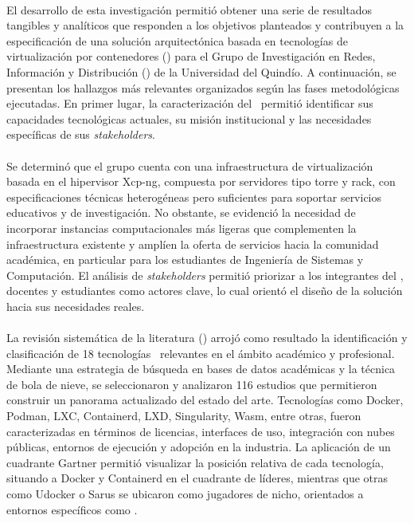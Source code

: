 \label{cap:resultados}
\mbox{}\\
El desarrollo de esta investigación permitió obtener una serie de resultados tangibles y analíticos que responden a los objetivos planteados y contribuyen a la especificación de una solución arquitectónica basada en tecnologías de virtualización por contenedores (\VBC) para el Grupo de Investigación en Redes, Información y Distribución (\GRID) de la Universidad del Quindío. A continuación, se presentan los hallazgos más relevantes organizados según las fases metodológicas ejecutadas. En primer lugar, la caracterización del \GRID\ permitió identificar sus capacidades tecnológicas actuales, su misión institucional y las necesidades específicas de sus \textit{stakeholders}.\\ \\
\noindent
Se determinó que el grupo cuenta con una infraestructura de virtualización basada en el hipervisor Xcp-ng, compuesta por servidores tipo torre y rack, con especificaciones técnicas heterogéneas pero suficientes para soportar servicios educativos y de investigación. No obstante, se evidenció la necesidad de incorporar instancias computacionales más ligeras que complementen la infraestructura existente y amplíen la oferta de servicios hacia la comunidad académica, en particular para los estudiantes de Ingeniería de Sistemas y Computación. El análisis de \textit{stakeholders} permitió priorizar a los integrantes del \GRID, docentes y estudiantes como actores clave, lo cual orientó el diseño de la solución hacia sus necesidades reales.  \\ \\
\noindent
La revisión sistemática de la literatura (\SMS) arrojó como resultado la identificación y clasificación de 18 tecnologías \VBC\ relevantes en el ámbito académico y profesional. Mediante una estrategia de búsqueda en bases de datos académicas y la técnica de bola de nieve, se seleccionaron y analizaron 116 estudios que permitieron construir un panorama actualizado del estado del arte. Tecnologías como Docker, Podman, LXC, Containerd, LXD, Singularity, Wasm, entre otras, fueron caracterizadas en términos de licencias, interfaces de uso, integración con nubes públicas, entornos de ejecución y adopción en la industria. La aplicación de un cuadrante Gartner permitió visualizar la posición relativa de cada tecnología, situando a Docker y Containerd en el cuadrante de líderes, mientras que otras como Udocker o Sarus se ubicaron como jugadores de nicho, orientados a entornos específicos como \HPC. \\ \\
